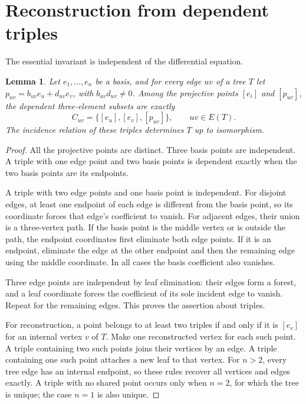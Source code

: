 \documentclass{amsart}
\newtheorem{lemma}[theorem]{Lemma}
\theoremstyle{remark}
\numberwithin{equation}{section}
\begin{document}
\section{Reconstruction from dependent triples}
The essential invariant is independent of the differential equation.

\begin{lemma}\label{lem:triangles}
Let $e_1,\ldots,e_n$ be a basis, and for every edge $uv$ of a tree $T$ let $p_{uv}=b_{uv}e_u+d_{uv}e_v$, with $b_{uv}d_{uv}\ne0$.
Among the projective points $[e_i]$ and $[p_{uv}]$, the dependent three-element subsets are exactly
\[
 C_{uv}=\{[e_u],[e_v],[p_{uv}]\},\qquad uv\in E(T).
\]
The incidence relation of these triples determines $T$ up to isomorphism.
\end{lemma}
\begin{proof}
All the projective points are distinct. Three basis points are independent. A triple with one edge point and two basis points is dependent exactly when the two basis points are its endpoints.

A triple with two edge points and one basis point is independent. For disjoint edges, at least one endpoint of each edge is different from the basis point, so its coordinate forces that edge's coefficient to vanish. For adjacent edges, their union is a three-vertex path. If the basis point is the middle vertex or is outside the path, the endpoint coordinates first eliminate both edge points. If it is an endpoint, eliminate the edge at the other endpoint and then the remaining edge using the middle coordinate. In all cases the basis coefficient also vanishes.

Three edge points are independent by leaf elimination: their edges form a forest, and a leaf coordinate forces the coefficient of its sole incident edge to vanish. Repeat for the remaining edges. This proves the assertion about triples.

For reconstruction, a point belongs to at least two triples if and only if it is $[e_v]$ for an internal vertex $v$ of $T$. Make one reconstructed vertex for each such point. A triple containing two such points joins their vertices by an edge. A triple containing one such point attaches a new leaf to that vertex. For $n>2$, every tree edge has an internal endpoint, so these rules recover all vertices and edges exactly. A triple with no shared point occurs only when $n=2$, for which the tree is unique; the case $n=1$ is also unique.
\end{proof}
\end{document}
